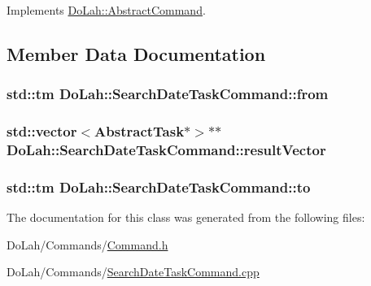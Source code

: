 Implements \hyperlink{class_do_lah_1_1_abstract_command_a9760328f2d6b85d8edc803a97a29dfc0}{Do\+Lah\+::\+Abstract\+Command}.



\subsection{Member Data Documentation}
\hypertarget{class_do_lah_1_1_search_date_task_command_a62585e0d7ef68fac2faa30f36b05aca6}{}
\subsubsection[{from}]{\setlength{\rightskip}{0pt plus 5cm}std\+::tm Do\+Lah\+::\+Search\+Date\+Task\+Command\+::from\hspace{0.3cm}{\ttfamily [private]}}\label{class_do_lah_1_1_search_date_task_command_a62585e0d7ef68fac2faa30f36b05aca6}
\hypertarget{class_do_lah_1_1_search_date_task_command_a060aa01ba9d63b26fa00f49287f2f594}{}
\subsubsection[{result\+Vector}]{\setlength{\rightskip}{0pt plus 5cm}std\+::vector$<${\bf Abstract\+Task}$\ast$$>$$\ast$$\ast$ Do\+Lah\+::\+Search\+Date\+Task\+Command\+::result\+Vector\hspace{0.3cm}{\ttfamily [private]}}\label{class_do_lah_1_1_search_date_task_command_a060aa01ba9d63b26fa00f49287f2f594}
\hypertarget{class_do_lah_1_1_search_date_task_command_ad94dbdc014aaf1532c8ea2f829e6d034}{}
\subsubsection[{to}]{\setlength{\rightskip}{0pt plus 5cm}std\+::tm Do\+Lah\+::\+Search\+Date\+Task\+Command\+::to\hspace{0.3cm}{\ttfamily [private]}}\label{class_do_lah_1_1_search_date_task_command_ad94dbdc014aaf1532c8ea2f829e6d034}


The documentation for this class was generated from the following files\+:\begin{DoxyCompactItemize}
\item 
Do\+Lah/\+Commands/\hyperlink{_command_8h}{Command.\+h}\item 
Do\+Lah/\+Commands/\hyperlink{_search_date_task_command_8cpp}{Search\+Date\+Task\+Command.\+cpp}\end{DoxyCompactItemize}
